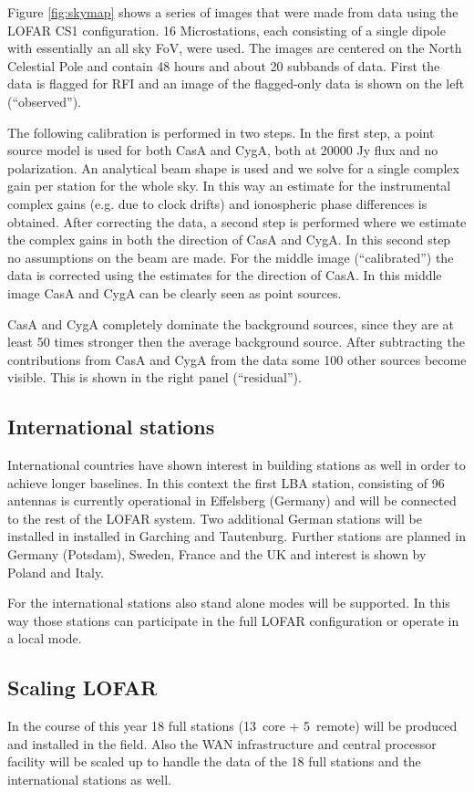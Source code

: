 \documentclass[journal]{IEEEtran}
\begin{document}
Figure \ref{fig:skymap} shows a series of images that were made from data using the LOFAR CS1 configuration. 16 Microstations, each consisting of a single dipole with essentially an all sky FoV, were used. The images are centered on the North Celestial Pole and contain 48 hours and about 20 subbands of data. First the data is flagged for RFI and an image of the flagged-only data is shown on the left (``observed''). 

The following calibration is performed in two steps. In the first step, a point source model is used for both CasA and CygA, both at 20000 Jy flux and no polarization. An analytical beam shape is used and we solve for a single complex gain per station for the whole sky. In this way an estimate for the instrumental complex gains (e.g. due to clock drifts) and ionospheric phase differences is obtained. After correcting the data, a second step is performed where we estimate the complex gains in both the direction of CasA and CygA. In this second step no assumptions on the beam are made. For the middle image (``calibrated'') the data is corrected using the estimates for the direction of CasA. In this middle image CasA and CygA can be clearly seen as point sources. 

CasA and CygA completely dominate the background sources, since they are at least 50 times stronger then the average background source. After subtracting the contributions from CasA and CygA from the data some 100 other sources become visible. This is shown in the right panel (``residual''). 

\subsection{International stations}
International countries have shown interest in building stations as well in order to achieve longer baselines. In this context the first LBA station, consisting of 96 antennas is currently operational in Effelsberg (Germany) and will be connected to the rest of the LOFAR system. Two additional German stations will be installed in installed in Garching and Tautenburg. Further stations are planned in Germany (Potsdam), Sweden, France and the UK and interest is shown by Poland and Italy.

For the international stations also stand alone modes will be supported. In this way those stations can participate in the full LOFAR configuration or operate in a local mode.

\subsection{Scaling LOFAR}
In the course of this year 18 full stations (13~core + 5~remote) will be produced and installed in the field. Also the WAN infrastructure and central processor facility will be scaled up to handle the data of the 18 full stations and the international stations as well. 
\end{document}
